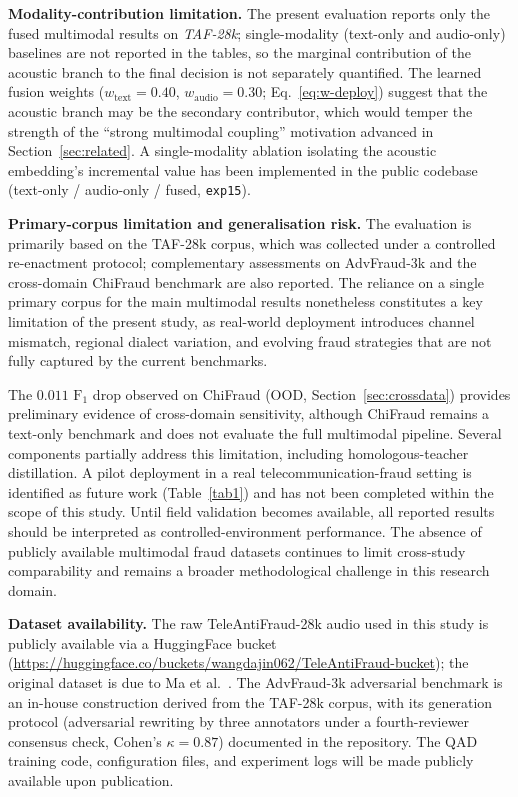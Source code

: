 \documentclass[a4paper,fleqn]{cas-sc}
\begin{document}
\textbf{Modality-contribution limitation.} The present evaluation reports only the fused multimodal results on \textit{TAF-28k}; single-modality (text-only and audio-only) baselines are not reported in the tables, so the marginal contribution of the acoustic branch to the final decision is not separately quantified. The learned fusion weights ($w_{\mathrm{text}} = 0.40$, $w_{\mathrm{audio}} = 0.30$; Eq.~\eqref{eq:w-deploy}) suggest that the acoustic branch may be the secondary contributor, which would temper the strength of the ``strong multimodal coupling'' motivation advanced in Section~\ref{sec:related}. A single-modality ablation isolating the acoustic embedding's incremental value has been implemented in the public codebase (text-only / audio-only / fused, \texttt{exp15}).

\textbf{Primary-corpus limitation and generalisation risk.}
The evaluation is primarily based on the TAF-28k corpus, which was collected under a controlled re-enactment protocol; complementary assessments on AdvFraud-3k and the cross-domain ChiFraud benchmark are also reported. The reliance on a single primary corpus for the main multimodal results nonetheless constitutes a key limitation of the present study, as real-world deployment introduces channel mismatch, regional dialect variation, and evolving fraud strategies that are not fully captured by the current benchmarks.

The $0.011$ $\text{F}_1$ drop observed on ChiFraud (OOD, Section~\ref{sec:crossdata}) provides preliminary evidence of cross-domain sensitivity, although ChiFraud remains a text-only benchmark and does not evaluate the full multimodal pipeline. Several components partially address this limitation, including homologous-teacher distillation. A pilot deployment in a real telecommunication-fraud setting is identified as future work (Table~\ref{tab1}) and has not been completed within the scope of this study. Until field validation becomes available, all reported results should be interpreted as controlled-environment performance. The absence of publicly available multimodal fraud datasets continues to limit cross-study comparability and remains a broader methodological challenge in this research domain.

\textbf{Dataset availability.}
The raw TeleAntiFraud-28k audio used in this study is publicly available via a HuggingFace bucket (\url{https://huggingface.co/buckets/wangdajin062/TeleAntiFraud-bucket}); the original dataset is due to Ma et al.~\citep{1}. The AdvFraud-3k adversarial benchmark is an in-house construction derived from the TAF-28k corpus, with its generation protocol (adversarial rewriting by three annotators under a fourth-reviewer consensus check, Cohen's $\kappa=0.87$) documented in the repository. The QAD training code, configuration files, and experiment logs will be made publicly available upon publication.
\end{document}
